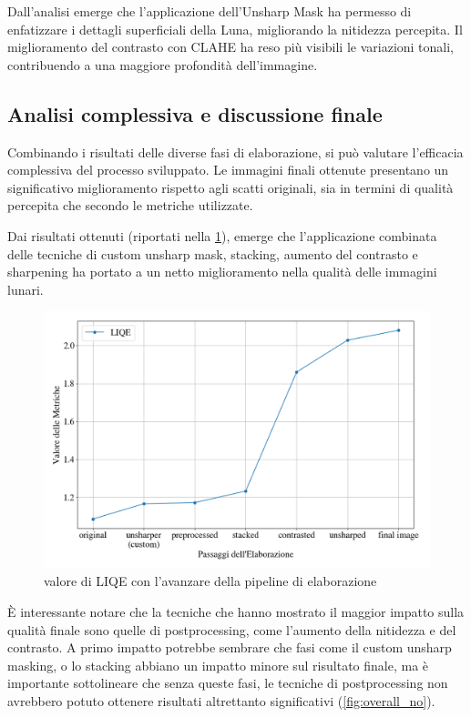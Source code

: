 Dall'analisi emerge che l'applicazione dell'Unsharp Mask ha permesso di enfatizzare i dettagli superficiali della Luna, migliorando la nitidezza percepita. Il miglioramento del contrasto con CLAHE ha reso più visibili le variazioni tonali, contribuendo a una maggiore profondità dell'immagine.

\subsection{Analisi complessiva e discussione finale}

Combinando i risultati delle diverse fasi di elaborazione, si può valutare l'efficacia complessiva del processo sviluppato. Le immagini finali ottenute presentano un significativo miglioramento rispetto agli scatti originali, sia in termini di qualità percepita che secondo le metriche utilizzate.


Dai risultati ottenuti (riportati nella \cref{fig:overall}), emerge che l'applicazione combinata delle tecniche di custom unsharp mask, stacking, aumento del contrasto e sharpening ha portato a un netto miglioramento nella qualità delle immagini lunari. 

\begin{figure}[H]
    \centering
    \includegraphics[width=0.8\linewidth]{../assets/overall.png}
    \caption{valore di LIQE con l'avanzare della pipeline di elaborazione}
    \label{fig:overall}
\end{figure}

È interessante notare che la tecniche che hanno mostrato il maggior impatto sulla qualità finale sono quelle di postprocessing, come l'aumento della nitidezza e del contrasto. A primo impatto potrebbe sembrare che fasi come il custom unsharp masking, o lo stacking abbiano un impatto minore sul risultato finale, ma è importante sottolineare che senza queste fasi, le tecniche di postprocessing non avrebbero potuto ottenere risultati altrettanto significativi (\cref{fig:overall_no}).

